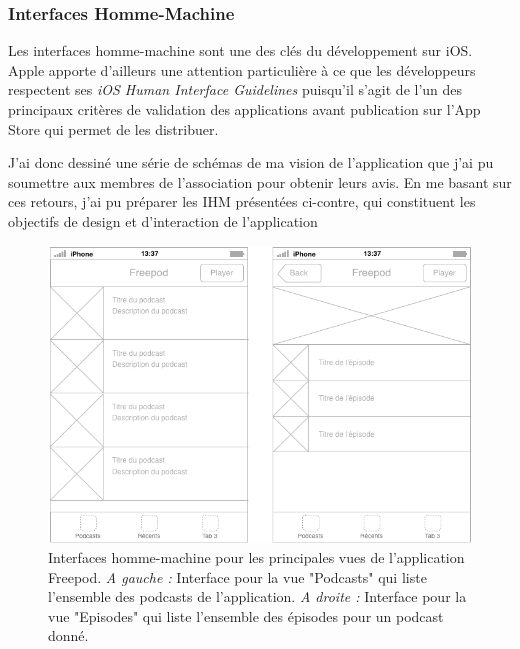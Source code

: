 \documentclass[11pt, french]{report}
\begin{document}
\subsubsection{Interfaces Homme-Machine}

Les interfaces homme-machine sont une des clés du développement sur iOS. Apple apporte d'ailleurs une attention particulière à ce que les développeurs respectent ses \textit{iOS Human Interface Guidelines} puisqu'il s'agit de l'un des principaux critères de validation des applications avant publication sur l'App Store qui permet de les distribuer.

J'ai donc dessiné une série de schémas de ma vision de l'application que j'ai pu soumettre aux membres de l'association pour obtenir leurs avis. En me basant sur ces retours, j'ai pu préparer les IHM présentées ci-contre, qui constituent les objectifs de design et d'interaction de l'application

\begin{figure}[!h]
	\begin{center}
	\includegraphics[width=12cm]{ihm_tableviews.png}
	\caption{\small{Interfaces homme-machine pour les principales vues de l'application Freepod. \textit{A gauche :} Interface pour la vue "Podcasts" qui liste l'ensemble des podcasts de l'application. \textit{A droite :} Interface pour la vue "Episodes" qui liste l'ensemble des épisodes pour un podcast donné.}} \label{classes}
	\end{center}
\end{figure}
\end{document}
